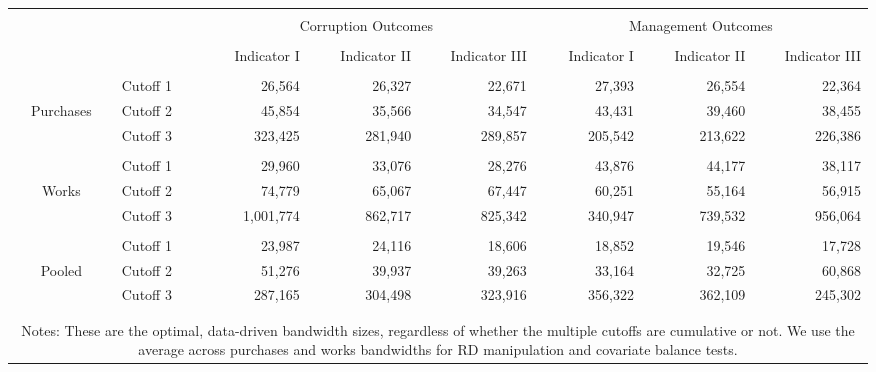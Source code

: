 \documentclass[border = 1pt$]{standalone}
\begin{document}
\scriptsize
\setlength{\tabcolsep}{-2pt}
\begin{tabular}{@{\extracolsep{6pt}}clrrrrrr}
\\[-1.8ex]\hline
\hline \\[-1.8ex]
& & \multicolumn{3}{c}{Corruption Outcomes} &  \multicolumn{3}{c}{Management Outcomes} \\[1.0ex]
\cline{3-5} \cline{6-8} \\[-1.8ex]
& & Indicator I & Indicator II & Indicator III & Indicator I & Indicator II & Indicator III \\[1.0ex]
\hline \\[-1.8ex]
          & Cutoff 1 & 26,564    & 26,327  & 22,671  & 27,393  & 26,554  & 22,364  \\[1.0ex]
Purchases & Cutoff 2 & 45,854    & 35,566  & 34,547  & 43,431  & 39,460  & 38,455  \\[1.0ex]
          & Cutoff 3 & 323,425   & 281,940 & 289,857 & 205,542 & 213,622 & 226,386 \\[1.0ex]
\hline \\[-1.8ex]
          & Cutoff 1 & 29,960    & 33,076  & 28,276  & 43,876  & 44,177  & 38,117  \\[1.0ex]
Works     & Cutoff 2 & 74,779    & 65,067  & 67,447  & 60,251  & 55,164  & 56,915  \\[1.0ex]
          & Cutoff 3 & 1,001,774 & 862,717 & 825,342 & 340,947 & 739,532 & 956,064 \\[1.0ex]
\hline \\[-1.8ex]
          & Cutoff 1 & 23,987    & 24,116  & 18,606  & 18,852  & 19,546  & 17,728  \\[1.0ex]
Pooled    & Cutoff 2 & 51,276    & 39,937  & 39,263  & 33,164  & 32,725  & 60,868  \\[1.0ex]
          & Cutoff 3 & 287,165   & 304,498 & 323,916 & 356,322 & 362,109 & 245,302 \\[-.8ex]
\\[-1.8ex]\hline
\hline \\[-1.8ex]
\multicolumn{8}{p{.73\textwidth}}{\scriptsize Notes: These are the \citet{CattaneoInterpretingRegressionDiscontinuity2016,CattaneoAnalysisRegressionDiscontinuity2018} optimal, data-driven bandwidth sizes, regardless of whether the multiple cutoffs are cumulative or not. We use the average across purchases and works bandwidths for RD manipulation and covariate balance tests.} \\
\end{tabular}
\end{document}
